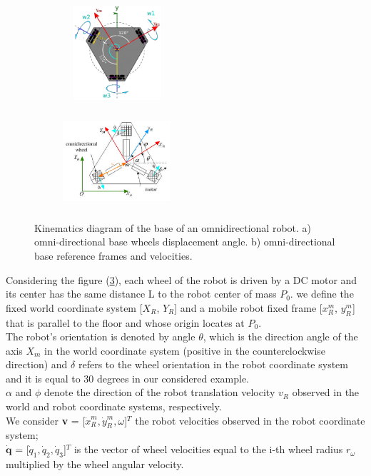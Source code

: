 \begin{figure}[H]
  \centering
  \begin{subfigure}[b]{0.4\textwidth}
     \centering
      \includegraphics[width=4cm, height=3.5cm]{images/03-foundation/triskarbase1}
	\caption{}
	\label{triskar1} 
  \end{subfigure}
  \begin{subfigure}[b]{0.4\textwidth}
  \centering
      \includegraphics[width=4cm, height=3.5cm]{images/03-foundation/triskarbase2}
	\caption{}
	\label{triskar2} 
  \end{subfigure}
  \caption{Kinematics diagram of the base of an omnidirectional robot. a) omni-directional base wheels displacement angle. b) omni-directional base reference frames and velocities.}
\end{figure}

Considering the figure (\ref{triskar2}), each wheel of the robot is driven by a DC motor and its center has the same distance L to the robot center of mass $P_0$. we define the fixed world coordinate system [$X_R$, $Y_R$] and a mobile robot fixed frame [${x}^m_R$, ${y}^m_R$] that is parallel to the floor and whose origin locates at $P_0$.\\
The robot's orientation is denoted by angle $\theta$, which is the direction angle of the axis $X_m$ in the world coordinate system (positive in the
counterclockwise direction) and $\delta$ refers to the wheel orientation in the robot coordinate system and it is equal to 30 degrees in our considered example.
\\
$\alpha$ and $\phi$ denote the direction of the robot translation velocity $v_R$ observed in the world and robot coordinate systems, respectively.\\
We consider \textbf{v} = [$\dot{x}^m_R,\dot{y}^m_R,\omega$]$^T$ the robot velocities observed in the robot coordinate system; \\
$\mathbf{\dot{q}}$ = [$\dot{q}_1,\dot{q}_2,\dot{q}_3$]$^T$ is the vector of wheel velocities equal to the i-th wheel radius $r_\omega$ multiplied by the wheel angular velocity.

